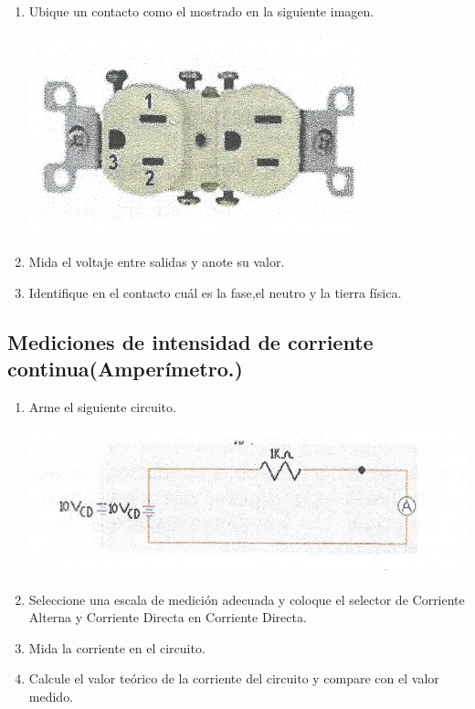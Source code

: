 \documentclass[10pt]{article}
\begin{document}
\begin{multicols}{2}
\begin{enumerate}
	\item Ubique un contacto como el mostrado en la siguiente imagen.\\
	\begin{center}
		\includegraphics{Imagenes/Fotos/Contacto.png}
	\end{center}
	\item Mida el voltaje entre salidas y anote su valor.
	\item Identifique en el contacto cuál es la fase,el neutro y la tierra física.
\end{enumerate}

\subsection{Mediciones de intensidad de corriente continua(Amperímetro.)}
\begin{enumerate}
	\item Arme el siguiente circuito.\\
	\begin{center}
		\includegraphics{Imagenes/Fotos/Circuito.png}
	\end{center}
	\item Seleccione una escala de medición adecuada y coloque el selector de Corriente Alterna y Corriente Directa en Corriente Directa.
	\item Mida la corriente en el circuito.
	\item Calcule el valor teórico de la corriente del circuito y compare con el valor medido.
\end{enumerate}


\end{multicols}
\end{document}
